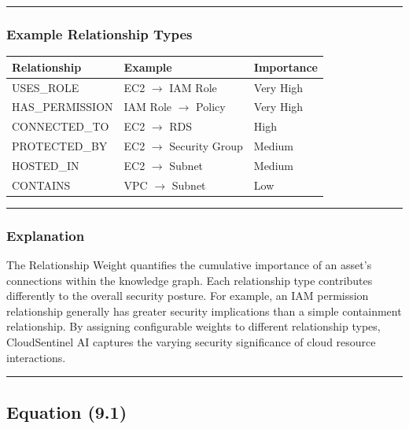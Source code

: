 \begin{center}\rule{0.5\linewidth}{0.5pt}\end{center}

\subsubsection{Example Relationship Types}

\begin{longtable}[]{@{}lll@{}}
\toprule\noalign{}
Relationship & Example & Importance \\
\midrule\noalign{}
\endhead
\bottomrule\noalign{}
\endlastfoot
USES\_ROLE & EC2 \(\rightarrow\) IAM Role & Very High \\
HAS\_PERMISSION & IAM Role \(\rightarrow\) Policy & Very High \\
CONNECTED\_TO & EC2 \(\rightarrow\) RDS & High \\
PROTECTED\_BY & EC2 \(\rightarrow\) Security Group & Medium \\
HOSTED\_IN & EC2 \(\rightarrow\) Subnet & Medium \\
CONTAINS & VPC \(\rightarrow\) Subnet & Low \\
\end{longtable}

\begin{center}\rule{0.5\linewidth}{0.5pt}\end{center}

\subsubsection{Explanation}

The Relationship Weight quantifies the cumulative importance of an asset's connections within the knowledge graph. Each relationship type contributes differently to the overall security posture. For example, an IAM permission relationship generally has greater security implications than a simple containment relationship. By assigning configurable weights to different relationship types, CloudSentinel AI captures the varying security significance of cloud resource interactions.

\begin{center}\rule{0.5\linewidth}{0.5pt}\end{center}

\subsection{Equation (9.1)}


